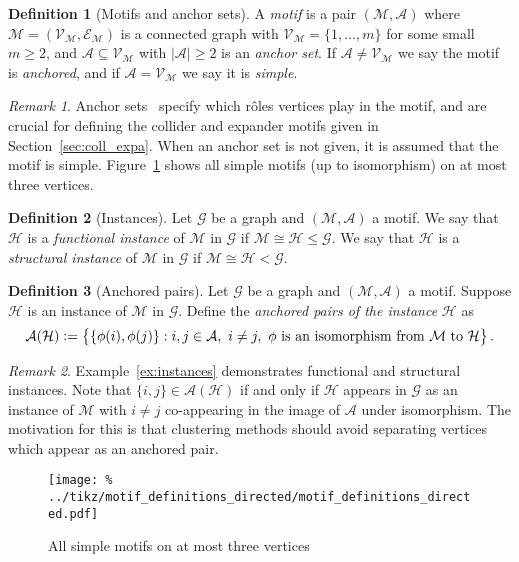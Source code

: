 \documentclass[12pt]{ociamthesis}
\theoremstyle{plain}
\theoremstyle{definition}
\newtheorem{definition}{Definition}[chapter]
\theoremstyle{remark}
\newtheorem*{remark}{Remark}
\newcommand\ca[1]{\mathcal{#1}}
\begin{document}
\begin{definition}[Motifs and anchor sets]
  A \emph{motif} is a pair $(\ca{M,A})$ where $\ca{M} = (\ca{V_M,E_M})$ is a
  connected graph with $\ca{V_M} = \{ 1, \ldots, m \}$ for some small $m \geq
  2$, and $\ca{A} \subseteq \ca{V_M}$ with $|\ca{A}| \geq 2$ is an \emph{anchor
  set}. If $\ca{A} \neq \ca{V_M}$ we say the motif is \emph{anchored}, and if
  $\ca{A=V_M}$ we say it is \emph{simple}.
\end{definition}

\begin{remark}
  Anchor sets~\cite{benson2016higher} specify which r\^oles vertices play in
  the motif, and are crucial for defining the collider and expander motifs
  given in Section~\ref{sec:coll_expa}. When an anchor set is not given, it is
  assumed that the motif is simple. Figure~\ref{fig:motif_definitions_directed}
  shows all simple motifs (up to isomorphism) on at most three vertices.
\end{remark}

\begin{definition}[Instances]
  Let $\ca{G}$ be a graph and $(\ca{M,A})$ a motif. We say that $\ca{H}$ is a
  \emph{functional instance} of $\ca{M}$ in $\ca{G}$ if $\ca{M} \cong \ca{H}
  \leq \ca{G}$. We say that $\ca{H}$ is a \emph{structural instance} of
  $\ca{M}$ in $\ca{G}$ if $\ca{M} \cong \ca{H} < \ca{G}$.
\end{definition}

\begin{definition}[Anchored pairs]
  Let $\ca{G}$ be a graph and $(\ca{M,A})$ a motif. Suppose $\ca{H}$ is an
  instance of $\ca{M}$ in $\ca{G}$. Define the \emph{anchored pairs of the
  instance} $\ca{H}$ as
  $$ \ca{A(H)} \vcentcolon = \big\{ \{\phi(i),\phi(j)\} : i,j \in \ca{A}, \ i
    \neq j, \ \phi \textrm{ is an isomorphism from } \ca{M} \textrm{ to } \ca{H}
  \big\}\,.$$

\end{definition}

\begin{remark}
  Example~\ref{ex:instances} demonstrates functional and structural instances.
  Note that $\{i,j\} \in \ca{A(H)}$ if and only if $\ca{H}$ appears in $\ca{G}$
  as an instance of $\ca{M}$ with $i \neq j$ co-appearing in the image of
  $\ca{A}$ under isomorphism. The motivation for this is that clustering
  methods should avoid separating vertices which appear as an anchored pair.
\end{remark}
%
\begin{figure}[H]
  \centering
  \texttt{[image: \%
  ../tikz/motif\_definitions\_directed/motif\_definitions\_directed.pdf]}
  \caption{All simple motifs on at most three vertices}
  \label{fig:motif_definitions_directed}
\end{figure}
\end{document}
